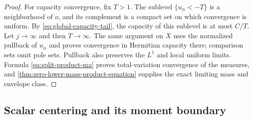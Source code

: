 \begin{proof}
For capacity convergence, fix $T>1$. The sublevel $\{u_\alpha<-T\}$ is a neighborhood of $o$, and its complement is a compact set on which convergence is uniform. By \eqref{eq:global-capacity-tail}, the capacity of this sublevel is at most $C/T$. Let $j\to\infty$ and then $T\to\infty$. The same argument on $X$ uses the normalized pullback of $u_\alpha$ and proves convergence in Hermitian capacity there; comparison sets omit pole sets. Pullback also preserves the $L^1$ and local uniform limits. Formula \eqref{eq:split-product-ma} proves total-variation convergence of the measures, and \cref{thm:zero-lower-mass-product-equation} supplies the exact limiting mass and envelope class.
\end{proof}

\subsection{Scalar centering and its moment boundary}

